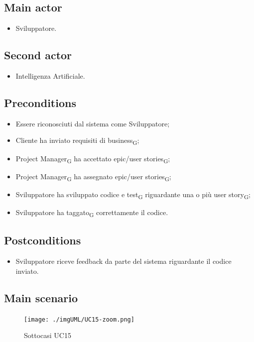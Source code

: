\documentclass{article}
\begin{document}
    \subsection*{Main actor}
        \begin{itemize}
            \item Sviluppatore.
        \end{itemize}
    \subsection*{Second actor}
        \begin{itemize}
            \item Intelligenza Artificiale.
        \end{itemize}
    
    \subsection*{Preconditions}
        \begin{itemize}
            \item Essere riconosciuti dal sistema come Sviluppatore;
            \item Cliente ha inviato requisiti di business\textsubscript{G};
            \item Project Manager\textsubscript{G} ha accettato epic/user stories\textsubscript{G};
            \item Project Manager\textsubscript{G} ha assegnato epic/user stories\textsubscript{G};
            \item Sviluppatore ha sviluppato codice e test\textsubscript{G} riguardante una o più user story\textsubscript{G};
            \item Sviluppatore ha taggato\textsubscript{G} correttamente il codice.
        \end{itemize}
        
    \subsection*{Postconditions}
        \begin{itemize}
            \item Sviluppatore riceve feedback da parte del sistema riguardante il codice inviato.
        \end{itemize}
    
    \subsection*{Main scenario}
        \begin{figure}[h]
          \centering
          \texttt{[image: ./imgUML/UC15-zoom.png]}
          \caption{Sottocasi UC15}
          \label{fig:UC15_sottocasi}
        \end{figure}
        
\end{document}
